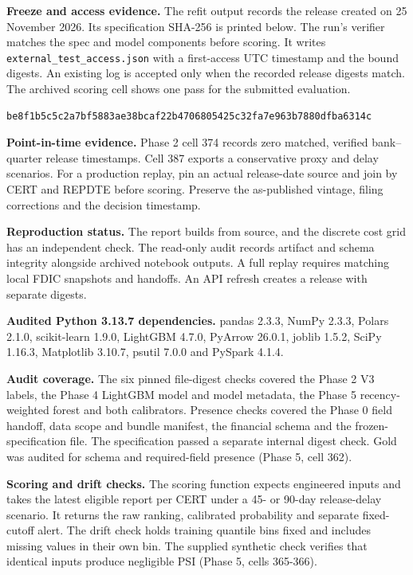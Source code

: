 \documentclass[
  12pt,
  a4paper,
]{article}
\begin{document}
\textbf{Freeze and access evidence.} The refit output records the
release created on 25 November 2026. Its specification SHA-256 is
printed below. The run's verifier matches the spec and model components
before scoring. It writes \texttt{external\_test\_access.json} with a
first-access UTC timestamp and the bound digests. An existing log is
accepted only when the recorded release digests match. The archived
scoring cell shows one pass for the submitted evaluation.

\begin{verbatim}
be8f1b5c5c2a7bf5883ae38bcaf22b4706805425c32fa7e963b7880dfba6314c
\end{verbatim}

\textbf{Point-in-time evidence.} Phase 2 cell 374 records zero matched,
verified bank--quarter release timestamps. Cell 387 exports a
conservative proxy and delay scenarios. For a production replay, pin an
actual release-date source and join by CERT and REPDTE before scoring.
Preserve the as-published vintage, filing corrections and the decision
timestamp.

\textbf{Reproduction status.} The report builds from source, and the
discrete cost grid has an independent check. The read-only audit records
artifact and schema integrity alongside archived notebook outputs. A
full replay requires matching local FDIC snapshots and handoffs. An API
refresh creates a release with separate digests.

\textbf{Audited Python 3.13.7 dependencies.} pandas 2.3.3, NumPy 2.3.3,
Polars 2.1.0, scikit-learn 1.9.0, LightGBM 4.7.0, PyArrow 26.0.1, joblib
1.5.2, SciPy 1.16.3, Matplotlib 3.10.7, psutil 7.0.0 and PySpark 4.1.4.

\textbf{Audit coverage.} The six pinned file-digest checks covered the
Phase 2 V3 labels, the Phase 4 LightGBM model and model metadata, the
Phase 5 recency-weighted forest and both calibrators. Presence checks
covered the Phase 0 field handoff, data scope and bundle manifest, the
financial schema and the frozen-specification file. The specification
passed a separate internal digest check. Gold was audited for schema and
required-field presence (Phase 5, cell 362).

\textbf{Scoring and drift checks.} The scoring function expects
engineered inputs and takes the latest eligible report per CERT under a
45- or 90-day release-delay scenario. It returns the raw ranking,
calibrated probability and separate fixed-cutoff alert. The drift check
holds training quantile bins fixed and includes missing values in their
own bin. The supplied synthetic check verifies that identical inputs
produce negligible PSI (Phase 5, cells 365-366).
\end{document}
